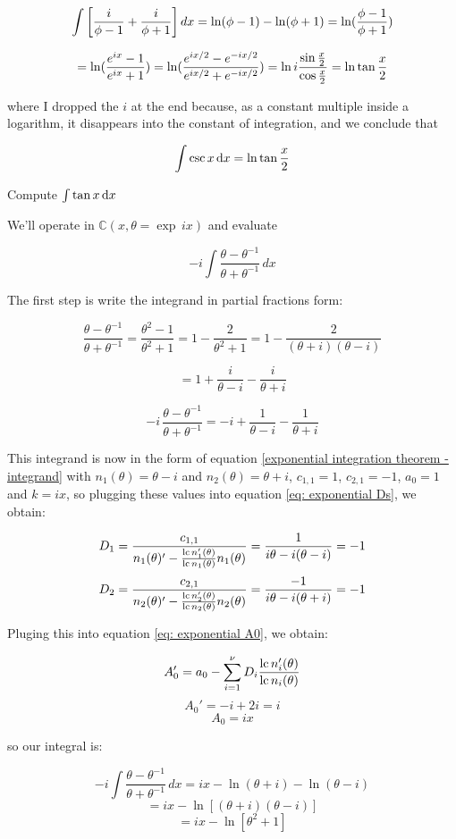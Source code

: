 $$\int \left[ {{i}\over{\phi-1}} + {{i}\over{\phi+1}} \right] dx
= \ln (\phi-1) - \ln(\phi+1) = \ln({{\phi-1}\over{\phi+1}})$$

$$ = \ln ({{e^{ix}-1}\over{e^{ix}+1}}) = \ln ({{e^{ix/2}-e^{-ix/2}}\over{e^{ix/2}+e^{-ix/2}}}) = \ln i {{\sin {x\over2}}\over{\cos {x\over2}}} = \ln \tan {x\over2} $$

where I dropped the $i$ at the end because, as a constant multiple
inside a logarithm, it disappears into the constant of integration,
and we conclude that

$$\int \csc x \,{\rm d}x = \ln \tan {x\over2} $$

\endexample

\vfil\eject

\example Compute $\int \tan x \, {\rm d}x$

We'll operate in ${\mathbb C}(x, \theta = \exp \,ix)$ and evaluate

$$-i \int \frac{\theta - \theta^{-1}}{\theta + \theta^{-1}} \,dx$$

The first step is write the integrand in partial fractions form:

$$\frac{\theta - \theta^{-1}}{\theta + \theta^{-1}} = \frac{\theta^2 - 1}{\theta^2 + 1}
= 1 - \frac{2}{\theta^2 + 1}
= 1 - \frac{2}{(\theta + i)(\theta - i)} $$

$$ = 1 + \frac{i}{\theta - i} - \frac{i}{\theta + i} $$

$$-i\, \frac{\theta - \theta^{-1}}{\theta + \theta^{-1}} = -i + \frac{1}{\theta - i} - \frac{1}{\theta + i} $$

This integrand is now in the form of equation
\eqref{exponential integration theorem - integrand} with
$n_1(\theta) = \theta -i$ and $n_2(\theta) = \theta + i$, $c_{1,1} = 1$,
$c_{2,1}=-1$, $a_0 = 1$ and $k=ix$, so plugging these values
into equation \eqref{eq: exponential Ds}, we obtain:


$$ D_1 = \frac{c_{1,1}}{n_1(\theta)' - \frac{{\rm lc\,} n_1'(\theta)}{{\rm lc\,} n_1(\theta)} n_1(\theta)} = \frac{1}{i \theta - i (\theta -i )} = -1$$
$$ D_2 = \frac{c_{2,1}}{n_2(\theta)' - \frac{{\rm lc\,} n_2'(\theta)}{{\rm lc\,} n_2(\theta)} n_2(\theta)} = \frac{-1}{i \theta - i (\theta +i )} = -1$$

Pluging this into equation \eqref{eq: exponential A0}, we obtain:

$$A_0' = a_0 - \sum_{i=1}^\nu D_i \frac{{\rm lc\,} n_i'(\theta)}{{\rm lc\,} n_i(\theta)}$$
$$A_0' = -i + 2i = i$$
$$A_0 = ix$$

so our integral is:

$$-i \int \frac{\theta - \theta^{-1}}{\theta + \theta^{-1}} \,dx
  = ix - \ln (\theta+i) - \ln(\theta-i)$$
$$  = ix - \ln \left[ (\theta+i)(\theta-i) \right]$$
$$  = ix - \ln \left[ \theta^2 + 1 \right]$$

